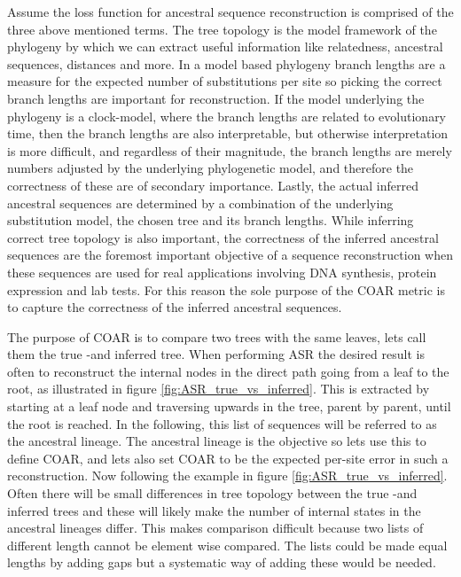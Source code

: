 Assume the loss function for ancestral sequence reconstruction is comprised of the three above mentioned terms.
The tree topology is the model framework of the phylogeny by which we can extract useful information like relatedness, ancestral sequences, distances and more.
In a model based phylogeny branch lengths are a measure for the expected number of substitutions per site so picking the correct branch lengths are important for reconstruction.
If the model underlying the phylogeny is a clock-model, where the branch lengths are related to evolutionary time, then the branch lengths are also interpretable, but otherwise interpretation is more difficult, and regardless of their magnitude, the branch lengths are merely numbers adjusted by the underlying phylogenetic model, and therefore the correctness of these are of secondary importance.
Lastly, the actual inferred ancestral sequences are determined by a combination of the underlying substitution model, the chosen tree and its branch lengths.
While inferring correct tree topology is also important, the correctness of the inferred ancestral sequences are the foremost important objective of a sequence reconstruction when these sequences are used for real applications involving DNA synthesis, protein expression and lab tests.
For this reason the sole purpose of the COAR metric is to capture the correctness of the inferred ancestral sequences.

The purpose of COAR is to compare two trees with the same leaves, lets call them the true -and inferred tree.
When performing ASR the desired result is often to reconstruct the internal nodes in the direct path going from a leaf to the root, as illustrated in figure \ref{fig:ASR_true_vs_inferred}.
This is extracted by starting at a leaf node and traversing upwards in the tree, parent by parent, until the root is reached.
In the following, this list of sequences will be referred to as the ancestral lineage.
The ancestral lineage is the objective so lets use this to define COAR, and lets also set COAR to be the expected per-site error in such a reconstruction.
Now following the example in figure \ref{fig:ASR_true_vs_inferred}.
Often there will be small differences in tree topology between the true -and inferred trees and these will likely make the number of internal states in the ancestral lineages differ.
This makes comparison difficult because two lists of different length cannot be element wise compared.
The lists could be made equal lengths by adding gaps but a systematic way of adding these would be needed.

